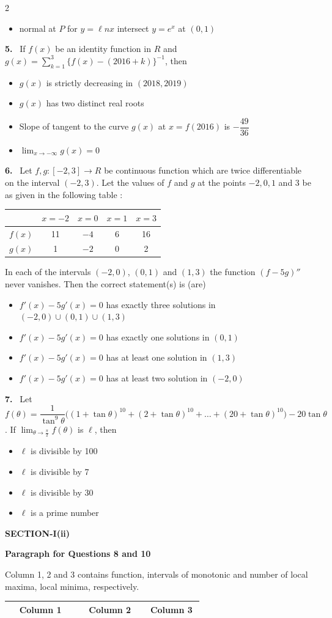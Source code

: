 \documentclass[10pt]{extarticle}
\newcommand{\sect}[1]{\par\smallskip\noindent\textbf{#1}\par}
\newcommand{\qn}[1]{\par\smallskip\noindent\textbf{#1.}~}
\newcommand{\paraq}[2]{\par\smallskip\noindent\textbf{Paragraph for Questions #1 and #2}\par}
\newenvironment{qoptions}{\begin{itemize}[leftmargin=1.8em,itemsep=1pt,topsep=2pt,label={}]}{\end{itemize}}
\newcommand{\opt}[2]{\item[(#1)] #2}
\begin{document}
\begin{multicols}{2}
\begin{qoptions}
\opt{D}{normal at $P$ for $y=\ell nx$ intersect $y=e^x$ at $(0,1)$}
\end{qoptions}
\qn{5} If $f(x)$ be an identity function in $R$ and $g(x)=\displaystyle\sum_{k=1}^{3}\{f(x)-(2016+k)\}^{-1}$, then
\begin{qoptions}
\opt{A}{$g(x)$ is strictly decreasing in $(2018,2019)$}
\opt{B}{$g(x)$ has two distinct real roots}
\opt{C}{Slope of tangent to the curve $g(x)$ at $x=f(2016)$ is $-\dfrac{49}{36}$}
\opt{D}{$\displaystyle\lim_{x\to-\infty}g(x)=0$}
\end{qoptions}
\qn{6} Let $f,g:[-2,3]\to R$ be continuous function which are twice differentiable on the interval $(-2,3)$. Let the values of $f$ and $g$ at the points $-2,0,1$ and $3$ be as given in the following table :\par
{\footnotesize\begin{tabular}{|c|c|c|c|c|}
\hline
 & $x=-2$ & $x=0$ & $x=1$ & $x=3$\\ \hline
$f(x)$ & 11 & $-4$ & 6 & 16\\ \hline
$g(x)$ & 1 & $-2$ & 0 & 2\\ \hline
\end{tabular}}\par
In each of the intervals $(-2,0)$, $(0,1)$ and $(1,3)$ the function $(f-5g)''$ never vanishes. Then the correct statement(s) is (are)
\begin{qoptions}
\opt{A}{$f'(x)-5g'(x)=0$ has exactly three solutions in $(-2,0)\cup(0,1)\cup(1,3)$}
\opt{B}{$f'(x)-5g'(x)=0$ has exactly one solutions in $(0,1)$}
\opt{C}{$f'(x)-5g'(x)=0$ has at least one solution in $(1,3)$}
\opt{D}{$f'(x)-5g'(x)=0$ has at least two solution in $(-2,0)$}
\end{qoptions}
\qn{7} Let $f(\theta)=\dfrac1{\tan^9\theta}\Big((1+\tan\theta)^{10}+(2+\tan\theta)^{10}+\ldots+(20+\tan\theta)^{10}\Big)-20\tan\theta$. If $\displaystyle\lim_{\theta\to\frac\pi2}f(\theta)$ is $\ell$, then
\begin{qoptions}
\opt{A}{$\ell$ is divisible by 100}
\opt{B}{$\ell$ is divisible by 7}
\opt{C}{$\ell$ is divisible by 30}
\opt{D}{$\ell$ is a prime number}
\end{qoptions}
\sect{SECTION-I(ii)}
\paraq{8}{10}
Column 1, 2 and 3 contains function, intervals of monotonic and number of local maxima, local minima, respectively.\par
{\footnotesize\setlength{\tabcolsep}{2pt}\begin{tabular}{|c|p{0.27\linewidth}|c|p{0.24\linewidth}|c|p{0.12\linewidth}|}
\hline
\multicolumn{2}{|c|}{\textbf{Column 1}} & \multicolumn{2}{c|}{\textbf{Column 2}} & \multicolumn{2}{c|}{\textbf{Column 3}}\\ \hline

\end{tabular}}
\end{multicols}
\end{document}
